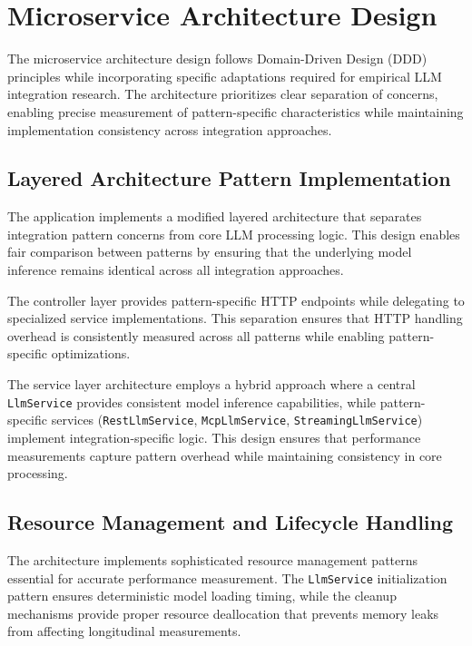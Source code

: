 
\section{Microservice Architecture Design}

The microservice architecture design follows Domain-Driven Design (DDD) principles while incorporating specific adaptations required for empirical LLM integration research. The architecture prioritizes clear separation of concerns, enabling precise measurement of pattern-specific characteristics while maintaining implementation consistency across integration approaches.


\subsection{Layered Architecture Pattern Implementation}

The application implements a modified layered architecture that separates integration pattern concerns from core LLM processing logic. This design enables fair comparison between patterns by ensuring that the underlying model inference remains identical across all integration approaches.

The controller layer provides pattern-specific HTTP endpoints while delegating to specialized service implementations. This separation ensures that HTTP handling overhead is consistently measured across all patterns while enabling pattern-specific optimizations.

The service layer architecture employs a hybrid approach where a central \texttt{LlmService} provides consistent model inference capabilities, while pattern-specific services (\texttt{RestLlmService}, \texttt{McpLlmService}, \texttt{StreamingLlmService}) implement integration-specific logic. This design ensures that performance measurements capture pattern overhead while maintaining consistency in core processing.

\subsection{Resource Management and Lifecycle Handling}

The architecture implements sophisticated resource management patterns essential for accurate performance measurement. The \texttt{LlmService} initialization pattern ensures deterministic model loading timing, while the cleanup mechanisms provide proper resource deallocation that prevents memory leaks from affecting longitudinal measurements.

